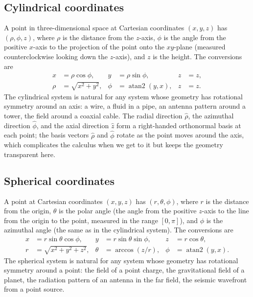 \subsection{Cylindrical coordinates}

A point in three-dimensional space at Cartesian coordinates
$(x, y, z)$ has  $(\rho, \phi,
z)$, where $\rho$ is the distance from the $z$-axis, $\phi$ is
the angle from the positive $x$-axis to the projection of the
point onto the $xy$-plane (measured counterclockwise looking down
the $z$-axis), and $z$ is the height. The conversions are
\begin{align*}
x &= \rho\cos\phi, & y &= \rho\sin\phi, & z &= z, \\
\rho &= \sqrt{x^{2} + y^{2}}, & \phi &= \operatorname{atan2}(y, x), & z &= z.
\end{align*}
The cylindrical system is natural for any system whose geometry
has rotational symmetry around an axis: a wire, a fluid in a
pipe, an antenna pattern around a tower, the field around a
coaxial cable. The radial direction $\hat{\rho}$, the azimuthal
direction $\hat{\phi}$, and the axial direction $\hat{z}$ form a
right-handed orthonormal basis at each point; the basis vectors
$\hat{\rho}$ and $\hat{\phi}$ rotate as the point moves around
the axis, which complicates the calculus when we get to it but
keeps the geometry transparent here.

\subsection{Spherical coordinates}

A point at Cartesian coordinates $(x, y, z)$ has  $(r, \theta, \phi)$, where $r$ is the distance from
the origin, $\theta$ is the polar angle (the angle from the
positive $z$-axis to the line from the origin to the point,
measured in the range $[0, \pi]$), and $\phi$ is the azimuthal
angle (the same as in the cylindrical system). The conversions
are
\begin{align*}
x &= r\sin\theta\cos\phi, & y &= r\sin\theta\sin\phi, & z &= r\cos\theta, \\
r &= \sqrt{x^{2} + y^{2} + z^{2}}, & \theta &= \arccos(z/r), & \phi &= \operatorname{atan2}(y, x).
\end{align*}
The spherical system is natural for any system whose geometry has
rotational symmetry around a point: the field of a point charge,
the gravitational field of a planet, the radiation pattern of an
antenna in the far field, the seismic wavefront from a point
source.

